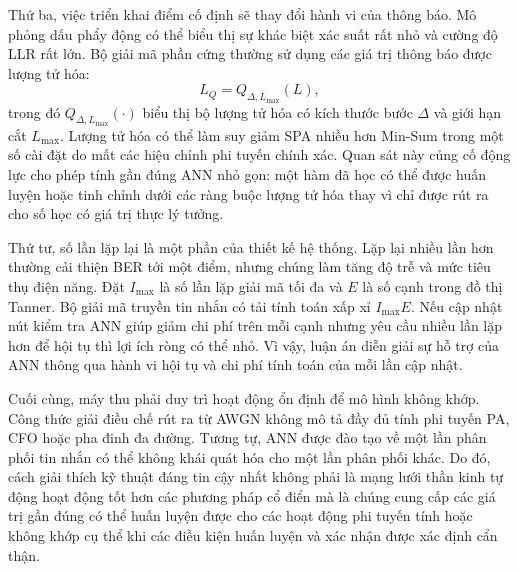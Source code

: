 Thứ ba, việc triển khai điểm cố định sẽ thay đổi hành vi của thông báo. Mô phỏng dấu phẩy động có thể biểu thị sự khác biệt xác suất rất nhỏ và cường độ LLR rất lớn. Bộ giải mã phần cứng thường sử dụng các giá trị thông báo được lượng tử hóa:
\begin{equation}
  L_Q=Q_{\Delta,L_{\max}}(L),
\end{equation}
trong đó $Q_{\Delta,L_{\max}}(\cdot)$ biểu thị bộ lượng tử hóa có kích thước bước $\Delta$ và giới hạn cắt $L_{\max}$. Lượng tử hóa có thể làm suy giảm SPA nhiều hơn Min-Sum trong một số cài đặt do mất các hiệu chỉnh phi tuyến chính xác. Quan sát này củng cố động lực cho phép tính gần đúng ANN nhỏ gọn: một hàm đã học có thể được huấn luyện hoặc tinh chỉnh dưới các ràng buộc lượng tử hóa thay vì chỉ được rút ra cho số học có giá trị thực lý tưởng.

Thứ tư, số lần lặp lại là một phần của thiết kế hệ thống. Lặp lại nhiều lần hơn thường cải thiện BER tới một điểm, nhưng chúng làm tăng độ trễ và mức tiêu thụ điện năng. Đặt $I_{\max}$ là số lần lặp giải mã tối đa và $E$ là số cạnh trong đồ thị Tanner. Bộ giải mã truyền tin nhắn có tải tính toán xấp xỉ $I_{\max}E$. Nếu cập nhật nút kiểm tra ANN giúp giảm chi phí trên mỗi cạnh nhưng yêu cầu nhiều lần lặp hơn để hội tụ thì lợi ích ròng có thể nhỏ. Vì vậy, luận án diễn giải sự hỗ trợ của ANN thông qua hành vi hội tụ và chi phí tính toán của mỗi lần cập nhật.

Cuối cùng, máy thu phải duy trì hoạt động ổn định để mô hình không khớp. Công thức giải điều chế rút ra từ AWGN không mô tả đầy đủ tính phi tuyến PA, CFO hoặc pha đinh đa đường. Tương tự, ANN được đào tạo về một lần phân phối tin nhắn có thể không khái quát hóa cho một lần phân phối khác. Do đó, cách giải thích kỹ thuật đáng tin cậy nhất không phải là mạng lưới thần kinh tự động hoạt động tốt hơn các phương pháp cổ điển mà là chúng cung cấp các giá trị gần đúng có thể huấn luyện được cho các hoạt động phi tuyến tính hoặc không khớp cụ thể khi các điều kiện huấn luyện và xác nhận được xác định cẩn thận.
